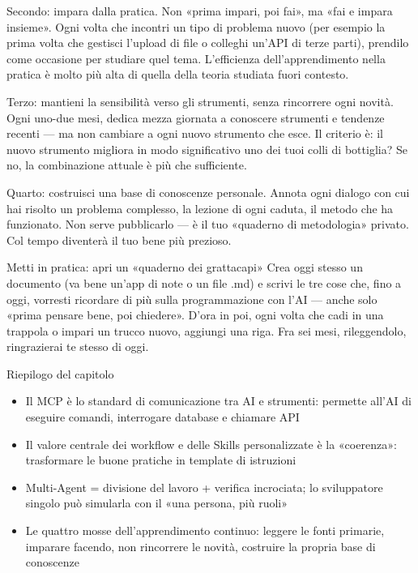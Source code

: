 Secondo: impara dalla pratica. Non «prima impari, poi fai», ma «fai e impara insieme». Ogni volta che incontri un tipo di problema nuovo (per esempio la prima volta che gestisci l'upload di file o colleghi un'API di terze parti), prendilo come occasione per studiare quel tema. L'efficienza dell'apprendimento nella pratica è molto più alta di quella della teoria studiata fuori contesto.

Terzo: mantieni la sensibilità verso gli strumenti, senza rincorrere ogni novità. Ogni uno-due mesi, dedica mezza giornata a conoscere strumenti e tendenze recenti — ma non cambiare a ogni nuovo strumento che esce. Il criterio è: il nuovo strumento migliora in modo significativo uno dei tuoi colli di bottiglia? Se no, la combinazione attuale è più che sufficiente.

Quarto: costruisci una base di conoscenze personale. Annota ogni dialogo con cui hai risolto un problema complesso, la lezione di ogni caduta, il metodo che ha funzionato. Non serve pubblicarlo — è il tuo «quaderno di metodologia» privato. Col tempo diventerà il tuo bene più prezioso.

\begin{tcbpractice}{Metti in pratica: apri un «quaderno dei grattacapi»}
Crea oggi stesso un documento (va bene un'app di note o un file .md) e scrivi le tre cose che, fino a oggi, vorresti ricordare di più sulla programmazione con l'AI — anche solo «prima pensare bene, poi chiedere». D'ora in poi, ogni volta che cadi in una trappola o impari un trucco nuovo, aggiungi una riga. Fra sei mesi, rileggendolo, ringrazierai te stesso di oggi.

\end{tcbpractice}

\begin{tcbsummary}{Riepilogo del capitolo}
\begin{itemize}
  \item Il MCP è lo standard di comunicazione tra AI e strumenti: permette all'AI di eseguire comandi, interrogare database e chiamare API
  \item Il valore centrale dei workflow e delle Skills personalizzate è la «coerenza»: trasformare le buone pratiche in template di istruzioni
  \item Multi-Agent = divisione del lavoro + verifica incrociata; lo sviluppatore singolo può simularla con il «una persona, più ruoli»
  \item Le quattro mosse dell'apprendimento continuo: leggere le fonti primarie, imparare facendo, non rincorrere le novità, costruire la propria base di conoscenze
\end{itemize}

\end{tcbsummary}
